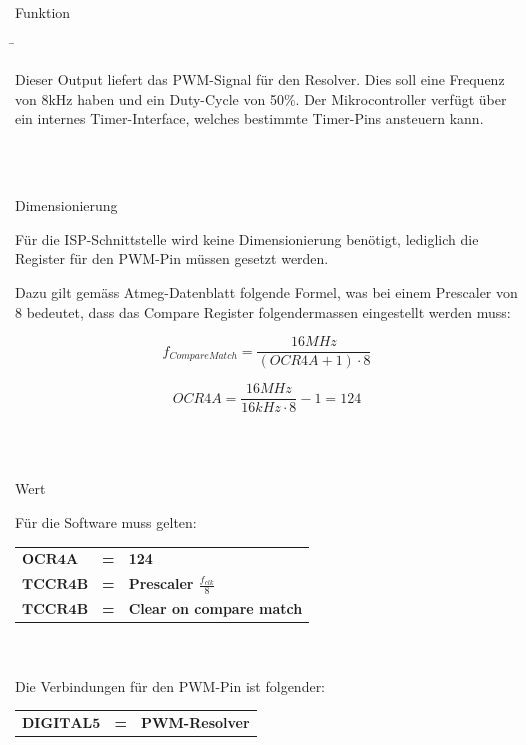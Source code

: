 \begin{tabbing}
\parbox[t]{.25\textwidth}{

Funktion

} \=\parbox[t]{.75\textwidth}{

Dieser Output liefert das PWM-Signal für den Resolver. Dies soll eine Frequenz von 8kHz haben und ein Duty-Cycle von 50\%. Der Mikrocontroller verfügt über ein internes Timer-Interface, welches bestimmte Timer-Pins ansteuern kann.

}\\
\\
\parbox[t]{.25\textwidth}{

Dimensionierung

} \>\parbox[t]{.75\textwidth}{

Für die ISP-Schnittstelle wird keine Dimensionierung benötigt, lediglich die Register für den PWM-Pin müssen gesetzt werden.

Dazu gilt gemäss Atmeg-Datenblatt folgende Formel, was bei einem Prescaler von 8 bedeutet, dass das Compare Register folgendermassen eingestellt werden muss:

\begin{equation}
f_{Compare Match} = \frac{16MHz}{(OCR4A+1) \cdot 8} 
\end{equation}

\begin{equation}
OCR4A = \frac{16MHz}{16kHz\cdot8}-1 = 124
\end{equation}

}\\
\\
\parbox[t]{.25\textwidth}{

Wert

} \>\parbox[t]{.75\textwidth}{

Für die Software muss gelten:

\begin{tabular}{lll}
$\mathbf{OCR4A}$ & \textbf{=} &  \textbf{124} \\
$\mathbf{TCCR4B}$ & \textbf{=} &  \textbf{Prescaler $\frac{f_{clk}}{8}$} \\
$\mathbf{TCCR4B}$ & \textbf{=} &  \textbf{Clear on compare match} \\
\end{tabular}\\
\\
Die Verbindungen für den PWM-Pin ist folgender:

\begin{tabular}{lll}
$\mathbf{DIGITAL5}$ & \textbf{=} &  \textbf{PWM-Resolver} \\
\end{tabular}

}
\end{tabbing}

